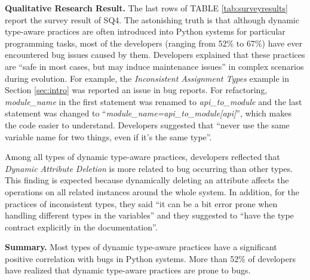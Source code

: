 \textbf{Qualitative Research Result.} 
The last rows of TABLE \ref{tab:surveyresults} report the survey result of SQ4. The astonishing truth is that although dynamic type-aware practices are often introduced into Python systems for particular programming tasks, most of the developers (ranging from 52\% to 67\%) have ever encountered bug issues caused by them. Developers explained that these practices are ``safe in most cases, but may induce maintenance issues'' in complex scenarios during evolution. For example, the \emph{Inconsistent Assignment Types} example in Section \ref{sec:intro} was reported an issue in bug reports. For refactoring, \emph{module\_name} in the first statement was renamed to \emph{api\_to\_module} and the last statement was changed to ``\textit{module\_name=api\_to\_module[api]}'', which makes the code easier to understand. Developers suggested that ``never use the same variable name for two things, even if it's the same type''.

Among all types of dynamic type-aware practices, developers reflected that \emph{Dynamic Attribute Deletion} is more related to bug occurring than other types. This finding is expected because dynamically deleting an attribute affects the operations on all related instances around the whole system. In addition, for the practices of inconsistent types, they said ``it can be a bit error prone when handling different types in the variables'' and they suggested to ``have the type contract explicitly in the documentation''.


\textbf{Summary.}
Most types of dynamic type-aware practices have a significant positive correlation with bugs in Python systems. More than 52\% of developers have realized that dynamic type-aware practices are prone to bugs.